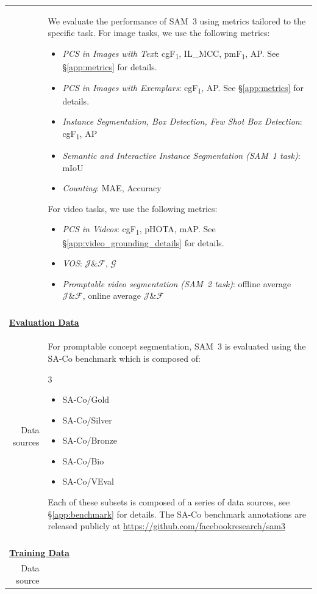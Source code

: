 \documentclass[]{fairmeta}
\newcommand{\samone}{SAM~1\xspace}
\newcommand{\samtwo}{SAM~2\xspace}
\newcommand{\model}{SAM~3\xspace}
\newcommand{\dsname}{{SA-Co}\xspace}
\newcommand{\evalgold}{{\dsname/Gold}\xspace}
\newcommand{\evalsilv}{{\dsname/Silver}\xspace}
\newcommand{\evalext}{{\dsname/Bronze}\xspace}
\newcommand{\evalbio}{{\dsname/Bio}\xspace}
\newcommand{\evalvid}{{\dsname/VEval}\xspace}
\newcommand{\mjf}{$\mathcal{J}\&\mathcal{F}$\xspace}
\newcommand{\mg}{$\mathcal{G}$}
\newcommand{\cgf}{cgF\textsubscript{1}\xspace}
\newcommand{\pmf}{pmF\textsubscript{1}\xspace}
\newcommand{\ilmcc}{IL\_MCC\xspace}
\begin{document}
\begin{table}[!htbp]
\begin{tabular*}{\linewidth}{r|p{10cm}}
& We evaluate the performance of \model using metrics tailored to the specific task.
\vspace{0.5em} 
For image tasks, we use the following metrics:
\begin{itemize}
\item \textit{PCS in Images with Text}: \cgf, \ilmcc, \pmf, AP. See \S  \ref{app:metrics} for details.
\item \textit{PCS in Images with Exemplars}: \cgf, AP. See \S  \ref{app:metrics} for details.
\item \textit{Instance Segmentation, Box Detection, Few Shot Box Detection}: \cgf, AP
\item \textit{Semantic and Interactive Instance Segmentation (\samone task)}: mIoU
\item \textit{Counting}: MAE, Accuracy
 \end{itemize}
 \vspace{0.5em} 
For video tasks, we use the following metrics:
\begin{itemize}
\item \textit{PCS in Videos}: \cgf, pHOTA, mAP. See \S \ref{app:video_grounding_details} for details.
\item \textit{VOS}: \mjf, \mg
\item \textit{Promptable video segmentation (\samtwo task)}: offline average \mjf, online average \mjf
\end{itemize}
\\

\multicolumn{2}{c}{} \\

\multicolumn{2}{l}{\bf\underline{Evaluation Data}} \\
Data sources &

For promptable concept segmentation, \model is evaluated using the \dsname benchmark which is composed of:
\vspace{-1em}
\begin{multicols}{3}
\begin{itemize}
    \item \evalgold
    \item \evalsilv
    \item \evalext
    \item \evalbio
    \item \evalvid
\end{itemize}
\end{multicols}
\vspace{-0.75em}
Each of these subsets is composed of a series of data sources, see \S \ref{app:benchmark} for details. The \dsname benchmark annotations are released publicly at \url{https://github.com/facebookresearch/sam3} \\
\multicolumn{2}{c}{} \\
\multicolumn{2}{l}{\bf\underline{Training Data}} \\
Data source &


\end{tabular*}
\end{table}
\end{document}
